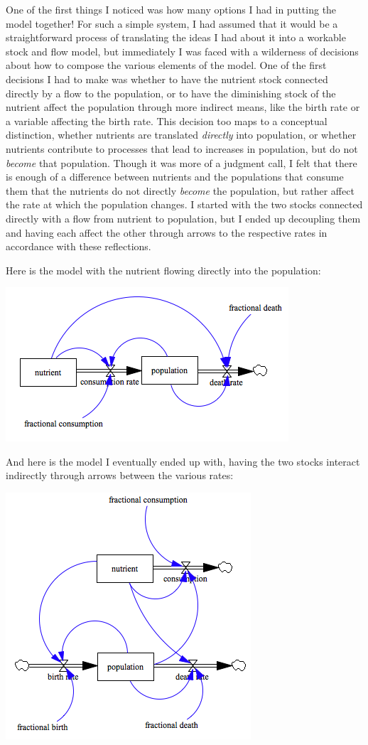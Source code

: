 \documentclass[12pt]{article}
\begin{document}
One of the first things I noticed was how many options I had in putting the model together!  For such a simple system, I had assumed that it would be a straightforward process of translating the ideas I had about it into a workable stock and flow model, but immediately I was faced with a wilderness of decisions about how to compose the various elements of the model.  One of the first decisions I had to make was whether to have the nutrient stock connected directly by a flow to the population, or to have the diminishing stock of the nutrient affect the population through more indirect means, like the birth rate or a variable affecting the birth rate.  This decision too maps to a conceptual distinction, whether nutrients are translated {\em directly} into population, or whether nutrients contribute to processes that lead to increases in population, but do not {\em become} that population.  Though it was more of a judgment call, I felt that there is enough of a difference between nutrients and the populations that consume them that the nutrients do not directly {\em become} the population, but rather affect the rate at which the population changes.  I started with the two stocks connected directly with a flow from nutrient to population, but I ended up decoupling them and having each affect the other through arrows to the respective rates in accordance with these reflections.  

Here is the model with the nutrient flowing directly into the population:

\includegraphics[scale=0.8]{initialmodel.png}

And here is the model I eventually ended up with, having the two stocks interact indirectly through arrows between the various rates:

\includegraphics[scale=0.8]{finalmodel.png}
\end{document}

